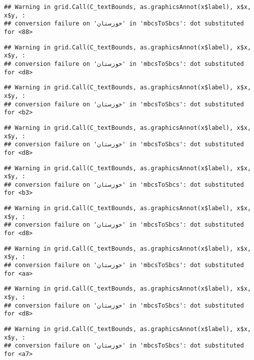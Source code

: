 \documentclass[
]{article}
\begin{document}
\begin{verbatim}
## Warning in grid.Call(C_textBounds, as.graphicsAnnot(x$label), x$x, x$y, :
## conversion failure on 'خوزستان' in 'mbcsToSbcs': dot substituted for <88>
\end{verbatim}

\begin{verbatim}
## Warning in grid.Call(C_textBounds, as.graphicsAnnot(x$label), x$x, x$y, :
## conversion failure on 'خوزستان' in 'mbcsToSbcs': dot substituted for <d8>
\end{verbatim}

\begin{verbatim}
## Warning in grid.Call(C_textBounds, as.graphicsAnnot(x$label), x$x, x$y, :
## conversion failure on 'خوزستان' in 'mbcsToSbcs': dot substituted for <b2>
\end{verbatim}

\begin{verbatim}
## Warning in grid.Call(C_textBounds, as.graphicsAnnot(x$label), x$x, x$y, :
## conversion failure on 'خوزستان' in 'mbcsToSbcs': dot substituted for <d8>
\end{verbatim}

\begin{verbatim}
## Warning in grid.Call(C_textBounds, as.graphicsAnnot(x$label), x$x, x$y, :
## conversion failure on 'خوزستان' in 'mbcsToSbcs': dot substituted for <b3>
\end{verbatim}

\begin{verbatim}
## Warning in grid.Call(C_textBounds, as.graphicsAnnot(x$label), x$x, x$y, :
## conversion failure on 'خوزستان' in 'mbcsToSbcs': dot substituted for <d8>
\end{verbatim}

\begin{verbatim}
## Warning in grid.Call(C_textBounds, as.graphicsAnnot(x$label), x$x, x$y, :
## conversion failure on 'خوزستان' in 'mbcsToSbcs': dot substituted for <aa>
\end{verbatim}

\begin{verbatim}
## Warning in grid.Call(C_textBounds, as.graphicsAnnot(x$label), x$x, x$y, :
## conversion failure on 'خوزستان' in 'mbcsToSbcs': dot substituted for <d8>
\end{verbatim}

\begin{verbatim}
## Warning in grid.Call(C_textBounds, as.graphicsAnnot(x$label), x$x, x$y, :
## conversion failure on 'خوزستان' in 'mbcsToSbcs': dot substituted for <a7>
\end{verbatim}
\end{document}
